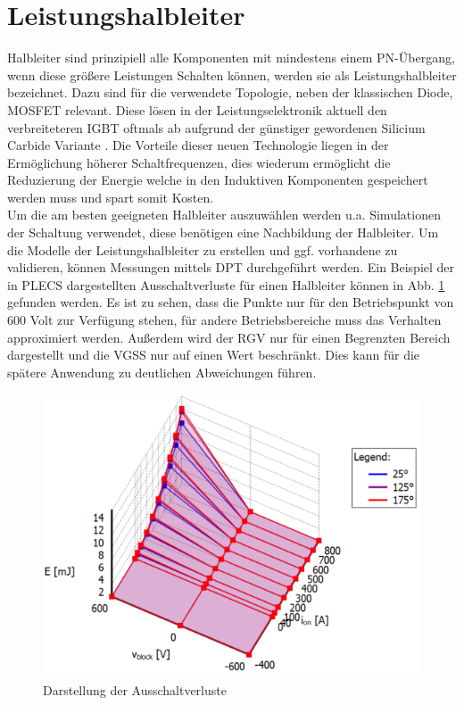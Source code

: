 \section{Leistungshalbleiter}
	Halbleiter sind prinzipiell alle Komponenten mit mindestens einem PN-Übergang, wenn diese größere Leistungen Schalten können, werden sie als Leistungshalbleiter bezeichnet. Dazu sind für die verwendete Topologie, neben der klassischen Diode, \gls{MOSFET}  relevant. Diese lösen in der Leistungselektronik aktuell den verbreiteteren IGBT oftmals ab aufgrund der günstiger gewordenen Silicium Carbide Variante \cite{SiCTrend}. Die Vorteile dieser neuen Technologie liegen in der Ermöglichung höherer Schaltfrequenzen, dies wiederum ermöglicht die Reduzierung der Energie welche in den Induktiven Komponenten gespeichert werden muss und spart somit Kosten.\\
	Um die am besten geeigneten Halbleiter auszuwählen werden u.a. Simulationen der Schaltung verwendet, diese benötigen eine Nachbildung der Halbleiter. Um die Modelle der Leistungshalbleiter zu erstellen und ggf. vorhandene zu validieren, können Messungen mittels \gls{DPT} durchgeführt werden. Ein Beispiel der in \gls{PLECS} dargestellten Ausschaltverluste für einen Halbleiter können in Abb. \ref{fig:plecsff2thermalmodel} gefunden werden. Es ist zu sehen, dass die Punkte nur für den Betriebspunkt von 600 Volt zur Verfügung stehen, für andere Betriebsbereiche muss das Verhalten approximiert werden. Außerdem wird der \gls{RGV} nur für einen Begrenzten Bereich dargestellt und die \gls{VGSS} nur auf einen Wert beschränkt. Dies kann für die spätere Anwendung zu deutlichen Abweichungen führen.
	\begin{figure}
		\centering
		\includegraphics[width=0.7\linewidth]{content/Grafiken/PLECS_FF2ThermalModel}
		\caption[Darstellung der Ausschaltverluste \cite{IFAGFF2}]{Darstellung der Ausschaltverluste \cite{IFAGFF2}}
		\label{fig:plecsff2thermalmodel}
	\end{figure}

